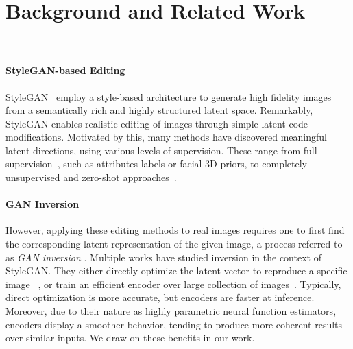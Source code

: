 \section{Background and Related Work}~\label{sec:rw}

\vspace{-12pt}

\paragraph{StyleGAN-based Editing}

StyleGAN~\cite{karras2019style, karras2020analyzing} employ a style-based architecture to generate high fidelity images from a semantically rich and highly structured latent space. Remarkably, StyleGAN enables realistic editing of images through simple latent code modifications.
Motivated by this, many methods have discovered meaningful latent directions, using various levels of supervision. These range from full-supervision~\cite{shen2020interpreting,abdal2020styleflow,denton2019detecting, goetschalckx2019ganalyze, tewari2020pie, tewari2020stylerig}, such as attributes labels or facial $3$D priors, to completely unsupervised and zero-shot approaches~\cite{harkonen2020ganspace,shen2020closedform,voynov2020unsupervised,wang2021a,patashnik2021styleclip,xia2021tedigan,gal2021stylegannada}.  

\paragraph{GAN Inversion}


However, applying these editing methods to real images requires one to first find the corresponding latent representation of the given image, a process referred to as \textit{GAN inversion} \cite{zhu2016generative,lipton2017precise,creswell2018inverting, yeh2017semantic, xia2021gan}. 
Multiple works have studied inversion in the context of StyleGAN.
They either directly optimize the latent vector to reproduce a specific image ~\cite{abdal2019image2stylegan,abdal2020image2stylegan++,semantic2019bau,zhu2020improved,gu2020image, xu2021continuity, roich2021pivotal}, or train an efficient encoder over large collection of images~\cite{zhu2020domain, pidhorskyi2020adversarial,guan2020collaborative,richardson2020encoding,tov2021designing,alaluf2021restyle,kang2021gan,kim2021exploiting, alaluf2021hyperstyle}. Typically, direct optimization is more accurate, but encoders are faster at inference. Moreover, due to their nature as highly parametric neural function estimators, encoders display a smoother behavior, tending to produce more coherent results over similar inputs. We draw on these benefits in our work.

